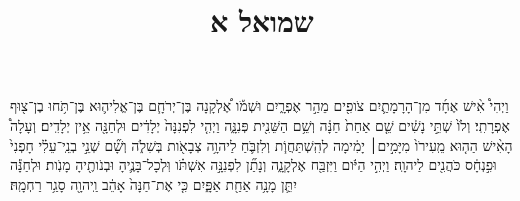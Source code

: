 \documentclass{openreader}
\title{שמואל א}
\date{}
\begin{document}
\maketitle
\raggedbottom 
\fontsize{16pt}{24pt}\selectfont


וַיְהִי֩ אִ֨ישׁ אֶחָ֜ד מִן־הָרָמָתַ֛יִם צֹופִ֖ים מֵהַ֣ר אֶפְרָ֑יִם וּשְׁמֹ֡ו אֶ֠לְקָנָה בֶּן־יְרֹחָ֧ם בֶּן־אֱלִיה֛וּא בֶּן־תֹּ֥חוּ בֶן־צ֖וּף אֶפְרָתִֽי׃ 
וְלֹו֙ שְׁתֵּ֣י נָשִׁ֔ים שֵׁ֤ם אַחַת֙ חַנָּ֔ה וְשֵׁ֥ם הַשֵּׁנִ֖ית פְּנִנָּ֑ה וַיְהִ֤י לִפְנִנָּה֙ יְלָדִ֔ים וּלְחַנָּ֖ה אֵ֥ין יְלָדִֽים׃ 
וְעָלָה֩ הָאִ֨ישׁ הַה֤וּא מֵֽעִירֹו֙ מִיָּמִ֣ים׀ יָמִ֔ימָה לְהִֽשְׁתַּחֲוֹ֧ת וְלִזְבֹּ֛חַ לַיהוָ֥ה צְבָאֹ֖ות בְּשִׁלֹ֑ה וְשָׁ֞ם שְׁנֵ֣י בְנֵֽי־עֵלִ֗י חָפְנִי֙ וּפִ֣נְחָ֔ס כֹּהֲנִ֖ים לַיהוָֽה׃ 
וַיְהִ֣י הַיֹּ֔ום וַיִּזְבַּ֖ח אֶלְקָנָ֑ה וְנָתַ֞ן לִפְנִנָּ֣ה אִשְׁתֹּ֗ו וּֽלְכָל־בָּנֶ֛יהָ וּבְנֹותֶ֖יהָ מָנֹֽות׃ 
וּלְחַנָּ֕ה יִתֵּ֛ן מָנָ֥ה אַחַ֖ת אַפָּ֑יִם כִּ֤י אֶת־חַנָּה֙ אָהֵ֔ב וַֽיהוָ֖ה סָגַ֥ר רַחְמָֽהּ׃ 
\end{document}
